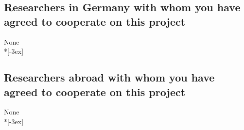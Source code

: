 \documentclass[11pt,a4paper,twoside]{scrartcl}
\begin{document}



\subsection{Researchers in Germany with whom you have agreed to cooperate on 
this 
project}

% 

\qquad \quad None \\*[-3ex]


\subsection{Researchers abroad with whom you have agreed to cooperate on this 
	project}
\label{sec:collab}

\qquad \quad None \\*[-3ex]
% 
%	
%	
%	
\end{document}
